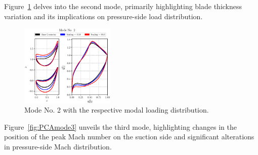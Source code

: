 \documentclass[11pt,a4paper,twocolumn]{article}
\newcommand\widthPCA{0.4}
\begin{document}
Figure~\ref{fig:PCAmode2} delves into the second mode, primarily highlighting blade thickness variation and its implications on pressure-side load distribution.

\begin{figure}[!h]
    \centering
    \includegraphics[width=\widthPCA\textwidth]{./images/mode02.eps}
    \caption{Mode No. 2 with the respective modal loading distribution.}
    \label{fig:PCAmode2}
\end{figure}

Figure~\ref{fig:PCAmode3} unveils the third mode, highlighting changes in the position of the peak Mach number on the suction side and significant alterations in pressure-side Mach distribution.
\end{document}
